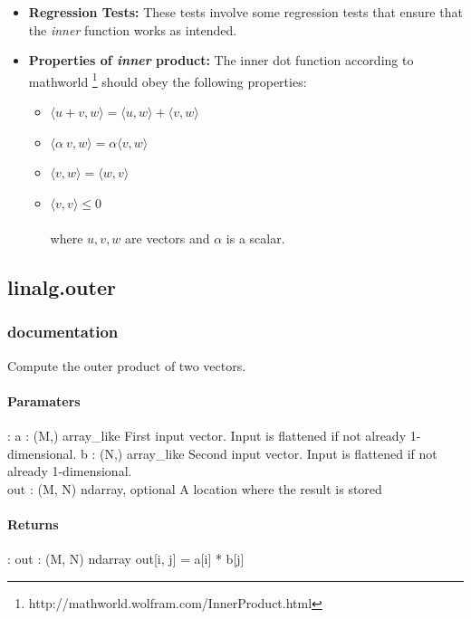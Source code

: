 \documentclass[a4paper,11pt]{article}
\begin{document}
\begin{itemize}
	\item \textbf{Regression Tests:} These tests involve some regression tests that ensure that the \textit{inner} function works as intended.
	
	\item \textbf{Properties of \textit{inner} product:} The inner dot function according to mathworld \footnote{http://mathworld.wolfram.com/InnerProduct.html} should obey the following properties:
	
	\begin{itemize}
		\item[1.] $ \langle u + v,w \rangle = \langle u , w \rangle + \langle v , w \rangle $ 
		\item[2.] $ \langle \alpha~v,w \rangle = \alpha \langle v , w \rangle $
		\item[3.] $ \langle v,w \rangle = \langle w, v \rangle $
		\item[4.] $ \langle v,v \rangle \leq 0 $
		\\
		\\ where $ u, v, w $ are vectors and $ \alpha $ is a scalar.
	\end{itemize}
	
\end{itemize}

\subsection{linalg.outer}
\subsubsection{documentation}
Compute the outer product of two vectors.

\paragraph{Paramaters}: 
a : (M,) array\_like
First input vector. Input is flattened if not already 1-dimensional.
b : (N,) array\_like
Second input vector. Input is flattened if not already 1-dimensional.\\
out : (M, N) ndarray, optional
A location where the result is stored\\
\paragraph{Returns}:    
out : (M, N) ndarray
out[i, j] = a[i] * b[j]
\end{document}
